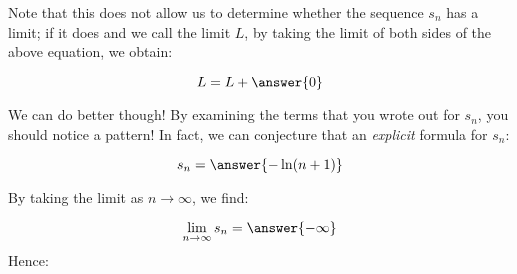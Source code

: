 \documentclass{ximera}
\begin{document}
\begin{exercise}
\begin{exercise}
\begin{hint}
\begin{question}
\begin{question}
Note that this does not allow us to determine whether the sequence $s_n$ has a limit; if it does and we call the limit $L$, by taking the limit of both sides of the above equation, we obtain:

\[
L = L +\answer{0}
\]

We can do better though!  By examining the terms that you wrote out for $s_n$, you should notice a pattern!  In fact, we can conjecture that an \emph{explicit} formula for $s_n$:

\[
s_n = \answer{-\ln(n+1)}
\]
\begin{question}
By taking the limit as $n \to \infty$, we find:

\[
\lim_{n \to \infty} s_n = \answer{-\infty}
\]
Hence:
\begin{multipleChoice}
\end{multipleChoice}

\end{question}
\end{question}
\end{question}
\end{hint}

\end{exercise}
\end{exercise}
\end{document}
